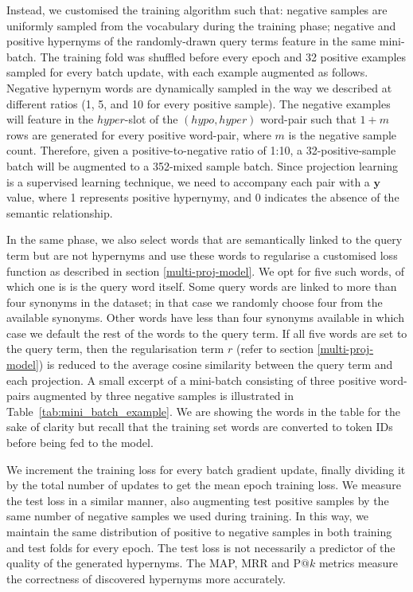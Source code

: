 Instead, we customised the training algorithm such that: negative samples are uniformly sampled from the vocabulary during the training phase; negative and positive hypernyms of the randomly-drawn query terms feature in the same mini-batch.  The training fold was shuffled before every epoch and 32 positive examples sampled for every batch update, with each example augmented as follows.  Negative hypernym words are dynamically sampled in the way we described at different ratios (1, 5, and 10 for every positive sample).  The negative examples will feature in the $hyper$-slot of the $(hypo,hyper)$ word-pair such that $1+m$ rows are generated for every positive word-pair, where $m$ is the negative sample count.  Therefore, given a positive-to-negative ratio of 1:10, a 32-positive-sample batch will be augmented to a 352-mixed sample batch.  Since projection learning is a supervised learning technique, we need to accompany each pair with a $\bm{y}$ value, where 1 represents positive hypernymy, and 0 indicates the absence of the semantic relationship.

In the same phase, we also select words that are semantically linked to the query term but are not hypernyms and use these words to regularise a customised loss function as described in section \ref{multi-proj-model}.  We opt for five such words, of which one is is the query word itself.  Some query words are linked to more than four synonyms in the dataset; in that case we randomly choose four from the available synonyms.  Other words have less than four synonyms available in which case we default the rest of the words to the query term.  If all five words are set to the query term, then the regularisation term $r$ (refer to section \ref{multi-proj-model}) is reduced to the average cosine similarity between the query term and each projection.  A small excerpt of a mini-batch consisting of three positive word-pairs augmented by three negative samples is illustrated in Table~\ref{tab:mini_batch_example}.  We are showing the words in the table for the sake of clarity but recall that the training set words are converted to token IDs before being fed to the model.

We increment the training loss for every batch gradient update, finally dividing it by the total number of updates to get the mean epoch training loss.  We measure the test loss in a similar manner, also augmenting test positive samples by the same number of negative samples we used during training.  In this way, we maintain the same distribution of positive to negative samples in both training and test folds for every epoch.  The test loss is not necessarily a predictor of the quality of the generated hypernyms.  The MAP, MRR and P$@k$ metrics measure the correctness of discovered hypernyms more accurately.  

